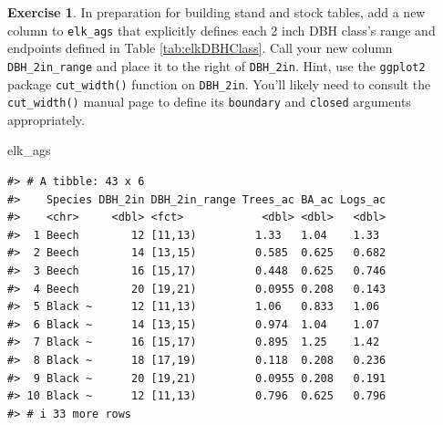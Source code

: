 \documentclass[
  11pt,
]{krantz}
\newenvironment{Shaded}{\begin{snugshade}}{\end{snugshade}}
\newcommand{\NormalTok}[1]{#1}
\theoremstyle{definition}
\theoremstyle{definition}
\theoremstyle{definition}
\newtheorem{exercise}{Exercise}[chapter]
\theoremstyle{definition}
\theoremstyle{remark}
\begin{document}
\begin{exercise}
\protect\hypertarget{exr:tidyr5}{}\label{exr:tidyr5}In preparation for building stand and stock tables, add a new column to \texttt{elk\_ags} that explicitly defines each 2 inch DBH class's range and endpoints defined in Table \ref{tab:elkDBHClass}. Call your new column \texttt{DBH\_2in\_range} and place it to the right of \texttt{DBH\_2in}. Hint, use the \texttt{ggplot2} package \texttt{cut\_width()} function on \texttt{DBH\_2in}. You'll likely need to consult the \texttt{cut\_width()} manual page to define its \texttt{boundary} and \texttt{closed} arguments appropriately.
\end{exercise}

\begin{Shaded}
\begin{Highlighting}[]
\NormalTok{elk\_ags}
\end{Highlighting}
\end{Shaded}

\begin{verbatim}
#> # A tibble: 43 x 6
#>    Species DBH_2in DBH_2in_range Trees_ac BA_ac Logs_ac
#>    <chr>     <dbl> <fct>            <dbl> <dbl>   <dbl>
#>  1 Beech        12 [11,13)         1.33   1.04    1.33 
#>  2 Beech        14 [13,15)         0.585  0.625   0.682
#>  3 Beech        16 [15,17)         0.448  0.625   0.746
#>  4 Beech        20 [19,21)         0.0955 0.208   0.143
#>  5 Black ~      12 [11,13)         1.06   0.833   1.06 
#>  6 Black ~      14 [13,15)         0.974  1.04    1.07 
#>  7 Black ~      16 [15,17)         0.895  1.25    1.42 
#>  8 Black ~      18 [17,19)         0.118  0.208   0.236
#>  9 Black ~      20 [19,21)         0.0955 0.208   0.191
#> 10 Black ~      12 [11,13)         0.796  0.625   0.796
#> # i 33 more rows
\end{verbatim}
\end{document}
